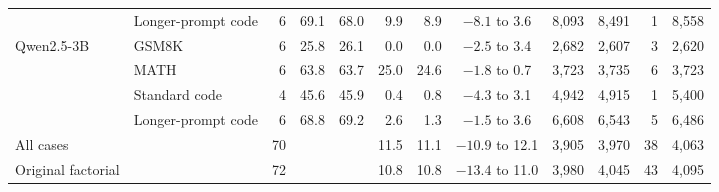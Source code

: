 \begin{table}[!htbp]
\begin{tabular*}{\linewidth}{@{\extracolsep{\fill}}llrrrrrcrrrr@{}}
 & Longer-prompt code & 6 & 69.1 & 68.0 & 9.9 & 8.9 & \(-8.1\) to 3.6 & 8,093 & 8,491 & 1 & 8,558 \\
\addlinespace[3pt]
Qwen2.5-3B & GSM8K & 6 & 25.8 & 26.1 & 0.0 & 0.0 & \(-2.5\) to 3.4 & 2,682 & 2,607 & 3 & 2,620 \\
 & MATH & 6 & 63.8 & 63.7 & 25.0 & 24.6 & \(-1.8\) to 0.7 & 3,723 & 3,735 & 6 & 3,723 \\
 & Standard code & 4 & 45.6 & 45.9 & 0.4 & 0.8 & \(-4.3\) to 3.1 & 4,942 & 4,915 & 1 & 5,400 \\
 & Longer-prompt code & 6 & 68.8 & 69.2 & 2.6 & 1.3 & \(-1.5\) to 3.6 & 6,608 & 6,543 & 5 & 6,486 \\
\midrule
All cases & & 70 & & & 11.5 & 11.1 & \(-10.9\) to 12.1 & 3,905 & 3,970 & 38 & 4,063 \\
Original factorial & & 72 & & & 10.8 & 10.8 & \(-13.4\) to 11.0 & 3,980 & 4,045 & 43 & 4,095 \\
\bottomrule
\end{tabular*}
\end{table}
